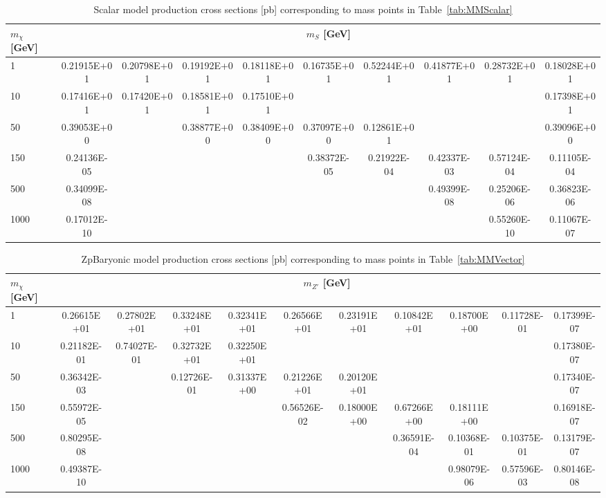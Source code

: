 \begin{table}[htbH]
\begin{center}
\begin{tabular}{l | c | c | c | c | c | c | c | c | c}
\hline 
$m_\chi$ [GeV] & \multicolumn{9}{c}{$m_{S}$ [GeV]} \\ 
\hline
1 & 0.21915E+01 & 0.20798E+01 & 0.19192E+01 & 0.18118E+01 & 0.16735E+01 & 0.52244E+01 & 0.41877E+01 & 0.28732E+01 & 0.18028E+01\\
10 & 0.17416E+01 & 0.17420E+01 & 0.18581E+01 & 0.17510E+01 & & & & & 0.17398E+01\\
50 & 0.39053E+00 & & 0.38877E+00 & 0.38409E+00 & 0.37097E+00 & 0.12861E+01 & & & 0.39096E+00\\
150 & 0.24136E-05 & & & & 0.38372E-05 & 0.21922E-04 & 0.42337E-03 & 0.57124E-04 & 0.11105E-04\\
500 & 0.34099E-08 & & & & & & 0.49399E-08 & 0.25206E-06 & 0.36823E-06\\
1000 & 0.17012E-10 & & & & & & & 0.55260E-10 & 0.11067E-07\\
\hline
\end{tabular}
\caption{Scalar model production cross sections [pb] corresponding to mass points in Table~\ref{tab:MMScalar} \label{tab:scalarxsecs}}
\end{center}
\end{table}

\begin{table}[htbH]
\begin{center}
\begin{tabular}{l | c | c | c | c | c | c | c | c | c | c}
\hline 
$m_\chi$ [GeV] & \multicolumn{10}{c}{$m_{Z'}$ [GeV]} \\ 
\hline
1 & 0.26615E+01 & 0.27802E+01 & 0.33248E+01 & 0.32341E+01 & 0.26566E+01 & 0.23191E+01 & 0.10842E+01 & 0.18700E+00 & 0.11728E-01 & 0.17399E-07\\
10 & 0.21182E-01 & 0.74027E-01 & 0.32732E+01 & 0.32250E+01 & & & & & & 0.17380E-07\\
50 & 0.36342E-03 & & 0.12726E-01 & 0.31337E+00  & 0.21226E+01 & 0.20120E+01 & & & & 0.17340E-07\\
150 & 0.55972E-05 & & & & 0.56526E-02 & 0.18000E+00 & 0.67266E+00 & 0.18111E+00 & & 0.16918E-07\\
500 & 0.80295E-08 & & & & & & 0.36591E-04 & 0.10368E-01 & 0.10375E-01 & 0.13179E-07\\
1000 & 0.49387E-10 & & & & & & & 0.98079E-06 & 0.57596E-03 & 0.80146E-08\\
\hline
\end{tabular}
\caption{ZpBaryonic model production cross sections [pb] corresponding to mass points in Table~\ref{tab:MMVector} \label{tab:zpbaryonicxsecs}}
\end{center}
\end{table}

